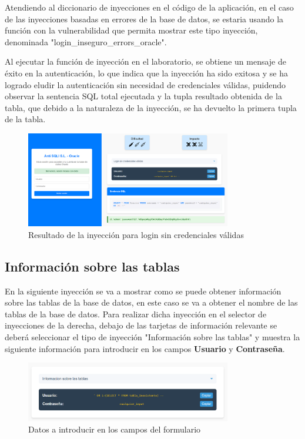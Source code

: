 \documentclass[a4paper,12pt]{article}
\begin{document}
Atendiendo al diccionario de inyecciones en el código de la aplicación, en el caso de las inyecciones basadas en errores de la base de datos, se estaria usando la función con la vulnerabilidad
que permita mostrar este tipo inyección, denominada "login\_inseguro\_errors\_oracle".

Al ejecutar la función de inyección en el laboratorio, se obtiene un mensaje de éxito en la autenticación, lo que indica que la inyección ha sido exitosa 
y se ha logrado eludir la autenticación sin necesidad de credenciales válidas, puidendo observar la sentencia SQL total ejecutada y la tupla resultado obtenida de la tabla,
que debido a la naturaleza de la inyección, se ha devuelto la primera tupla de la tabla.

\begin{figure}[H]
    \centering
    \includegraphics[width=0.8\textwidth]{Imagenes/error4.png}
    \caption{Resultado de la inyección para login sin credenciales válidas}
\end{figure}

\subsection{Información sobre las tablas}

En la siguiente inyección se va a mostrar como se puede obtener información sobre las tablas de la base de datos, 
en este caso se va a obtener el nombre de las tablas de la base de datos.
Para realizar dicha inyección en el selector de inyecciones de la derecha, 
debajo de las tarjetas de información relevante se deberá seleccionar el tipo de inyección "Información sobre las tablas"
y muestra la siguiente información para introducir en los campos \textbf{Usuario} y \textbf{Contraseña}.

\begin{figure}[H]
    \centering
    \includegraphics[width=0.8\textwidth]{Imagenes/error5.png}
    \caption{Datos a introducir en los campos del formulario}
\end{figure}
\end{document}
